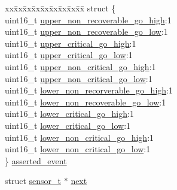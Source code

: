 \begin{DoxyCompactItemize}
\item 
\begin{tabbing}
xx\=xx\=xx\=xx\=xx\=xx\=xx\=xx\=xx\=\kill
struct \{\\
\>uint16\_t \hyperlink{structsensor__t_a3456e5e9d1f05ca2a1ccd7c572e4190a}{upper\_non\_recoverable\_go\_high}:1\\
\>uint16\_t \hyperlink{structsensor__t_a970d0c47571b67b82ce142c09f3e4cd1}{upper\_non\_recoverable\_go\_low}:1\\
\>uint16\_t \hyperlink{structsensor__t_aa74c3a8adf9c4480153c1f4ae10100e6}{upper\_critical\_go\_high}:1\\
\>uint16\_t \hyperlink{structsensor__t_a10f8c6f4faa04351930990b8cb9e4d52}{upper\_critical\_go\_low}:1\\
\>uint16\_t \hyperlink{structsensor__t_a65fc85fc5c16933bf308ae64c8235b3f}{upper\_non\_critical\_go\_high}:1\\
\>uint16\_t \hyperlink{structsensor__t_a9348f81c165dbfc83b26377082ddc5fa}{upper\_non\_critical\_go\_low}:1\\
\>uint16\_t \hyperlink{structsensor__t_adbe02872f1487a8178b5badbdd01ae92}{lower\_non\_recorverable\_go\_high}:1\\
\>uint16\_t \hyperlink{structsensor__t_a7b7512bfa4d79e702d933aab18183fac}{lower\_non\_recoverable\_go\_low}:1\\
\>uint16\_t \hyperlink{structsensor__t_a943379247f53b621035e9d93a1bca8d8}{lower\_critical\_go\_high}:1\\
\>uint16\_t \hyperlink{structsensor__t_a50761c09c8fc65579ecb51e9719b5bdc}{lower\_critical\_go\_low}:1\\
\>uint16\_t \hyperlink{structsensor__t_a9ac66b9c8e237a856ecbd6a45a18a3ae}{lower\_non\_critical\_go\_high}:1\\
\>uint16\_t \hyperlink{structsensor__t_a3f71fa7e855539a647ac25828f8ed9f0}{lower\_non\_critical\_go\_low}:1\\
\} \hyperlink{structsensor__t_a1c2f2c399c7df940cdd4bdc52c8620a6}{asserted\_event}\\

\end{tabbing}\item 
struct \hyperlink{structsensor__t}{sensor\-\_\-t} $\ast$ \hyperlink{structsensor__t_a3a6e7046e6865b0baa88be87ae6765b0}{next}
\end{DoxyCompactItemize}


